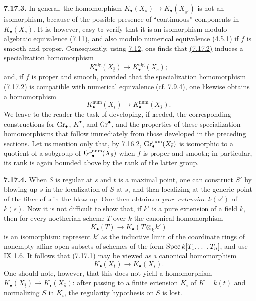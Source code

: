 \textbf{7.17.3.}
In general, the homomorphism
$K_\bullet(X_{\bar s})\to K_\bullet(X_{\overline{s'}})$ is not an
isomorphism, because of the possible presence of ``continuous'' components
in $K_\bullet(X_{\bar s})$. It is, however, easy to verify that it is an
isomorphism modulo algebraic equivalence \hyperlink{sga6.e10.para.7-11}{(7.11)}, and also modulo numerical
equivalence \hyperlink{sga6.e10.def.4-5-1}{(4.5.1)} if $f$ is smooth and proper. Consequently, using \hyperlink{sga6.e10.para.7-12}{7.12},
one finds that \hyperlink{sga6.e10.eq.7-17-2}{(7.17.2)} induces a specialization homomorphism
\begin{equation}\tag{7.17.3.1}
K_\bullet^{\mathrm{alg}}(X_{\bar t})
  \longrightarrow K_\bullet^{\mathrm{alg}}(X_{\bar s});
\end{equation}
and, if $f$ is proper and smooth, provided that the specialization
homomorphism \hyperlink{sga6.e10.eq.7-17-2}{(7.17.2)} is compatible with numerical equivalence (cf. \hyperlink{sga6.e10.para.7-9-4}{7.9.4}),
one likewise obtains a homomorphism
\begin{equation}\tag{7.17.3.2}
K_\bullet^{\mathrm{num}}(X_{\bar t})
  \longrightarrow K_\bullet^{\mathrm{num}}(X_{\bar s}).
\end{equation}
We leave to the reader the task of developing, if needed, the corresponding
constructions for $\operatorname{Gr}_\bullet$, $K^\bullet$, and $\operatorname{Gr}^\bullet$, and the
properties of these specialization homomorphisms that follow immediately
from those developed in the preceding sections. Let us mention only
that, by \hyperlink{sga6.e10.para.7-16-2}{7.16.2}, $\operatorname{Gr}_\bullet^{\mathrm{num}}(X_{\bar t})$ is isomorphic to a
quotient of a subgroup of $\operatorname{Gr}_\bullet^{\mathrm{num}}(X_{\bar s})$ when $f$
is proper and smooth; in particular, its rank is again bounded above by the
rank of the latter group.

\textbf{7.17.4.}
When $S$ is regular at $s$ and $t$ is a maximal point, one can construct
$S'$ by
blowing up $s$ in the localization of $S$ at $s$, and then localizing at the
generic point of the fiber of $s$ in the blow-up. One then obtains a
\emph{pure extension} $k(s')$ of $k(s)$. Now it is not difficult to show
that, if $k'$ is a pure extension of a field $k$, then for every noetherian
scheme $T$ over $k$ the canonical homomorphism
\[
K_\bullet(T)\longrightarrow K_\bullet(T\otimes_k k')
\]
is an isomorphism: represent $k'$ as the inductive limit of the coordinate
rings of nonempty affine open subsets of schemes of the form
$\operatorname{Spec} k[T_1,\ldots,T_n]$, and use \hyperlink{sga6.e09.prop.1-6}{IX 1.6}. It follows that \hyperlink{sga6.e10.eq.7-17-1}{(7.17.1)} may be
viewed as a canonical homomorphism
\begin{equation}\tag{7.17.4.1}
K_\bullet(X_t)\longrightarrow K_\bullet(X_s).
\end{equation}
One should note, however, that this does not yield a homomorphism
$K_\bullet(X_{\bar t})\to K_\bullet(X_{\bar s})$: after passing to a finite
extension $K_i$ of $K=k(t)$ and normalizing $S$ in $K_i$, the regularity
hypothesis on $S$ is lost.

